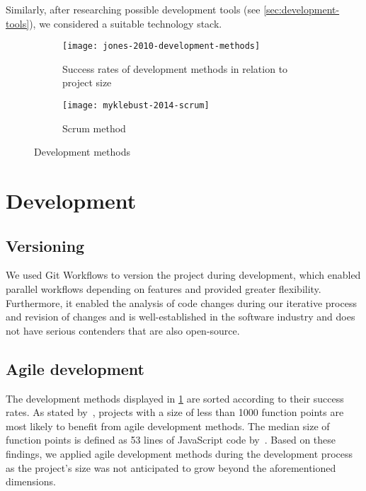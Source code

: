 Similarly, after researching possible development tools (see \cref{sec:development-tools}), we considered a suitable technology stack.

\begin{figure}[H]
    \begin{subfigure}[b]{\textwidth}
        \centering
        \texttt{[image: jones-2010-development-methods]}
        \caption[Success rates of development methods]{Success rates of development methods in relation to project size~\autocite[11]{jones_software_2010}}
        \label{fig:success-rates-development-methods}
    \end{subfigure}
    \begin{subfigure}[b]{\textwidth}
        \centering
        \texttt{[image: myklebust-2014-scrum]}
        \caption[Scrum method]{Scrum method~\autocite[2]{myklebust_scrum_nodate}}
        \label{fig:scrum-method}
    \end{subfigure}
    \caption{Development methods}\label{fig:development-methods}
\end{figure}

\section{Development}\label{sec:development}

\subsection{Versioning}\label{subsec:versioning}

We used Git Workflows to version the project during development, which enabled parallel workflows depending on features and provided greater flexibility.
Furthermore, it enabled the analysis of code changes during our iterative process and revision of changes and is well-established in the software industry and does not have serious contenders that are also open-source.

\subsection{Agile development}\label{subsec:agile-development}

The development methods displayed in \cref{fig:success-rates-development-methods} are sorted according to their success rates.
As stated by~\textcite[10-12]{jones_software_2010}, projects with a size of less than 1000 function points are most likely to benefit from agile development methods.
The median size of function points is defined as 53 lines of JavaScript code by~\textcite{qsm_function_2009}.
Based on these findings, we applied agile development methods during the development process as the project's size was not anticipated to grow beyond the aforementioned dimensions.


